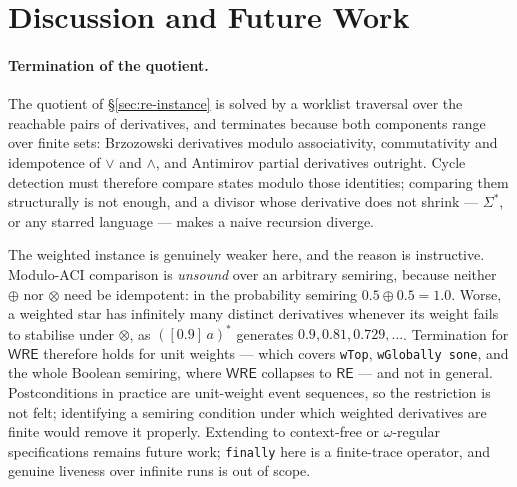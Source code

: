 \documentclass[acmsmall,screen]{acmart}
\newcommand{\RE}{\mathsf{RE}}
\newcommand{\WRE}{\mathsf{WRE}}
\begin{document}
\section{Discussion and Future Work}
\label{sec:discussion}

\paragraph{Termination of the quotient.}
The quotient of \S\ref{sec:re-instance} is solved by a worklist traversal
over the reachable pairs of derivatives, and terminates because both
components range over finite sets: Brzozowski derivatives modulo
associativity, commutativity and idempotence of $\vee$ and $\wedge$, and
Antimirov partial derivatives outright.
Cycle detection must therefore compare states modulo those identities;
comparing them structurally is not enough, and a divisor whose derivative
does not shrink --- $\Sigma^*$, or any starred language --- makes a naive
recursion diverge.

The weighted instance is genuinely weaker here, and the reason is
instructive.
Modulo-ACI comparison is \emph{unsound} over an arbitrary semiring, because
neither $\oplus$ nor $\otimes$ need be idempotent: in the probability
semiring $0.5 \oplus 0.5 = 1.0$.
Worse, a weighted star has infinitely many distinct derivatives whenever its
weight fails to stabilise under $\otimes$, as $([0.9]\,a)^*$ generates
$0.9, 0.81, 0.729, \dots$.
Termination for $\WRE$ therefore holds for unit weights --- which covers
\lstinline{wTop}, \lstinline{wGlobally sone}, and the whole Boolean
semiring, where $\WRE$ collapses to $\RE$ --- and not in general.
Postconditions in practice are unit-weight event sequences, so the
restriction is not felt; identifying a semiring condition under which
weighted derivatives are finite would remove it properly.
Extending to context-free or $\omega$-regular specifications remains future
work; \lstinline{finally} here is a finite-trace operator, and genuine
liveness over infinite runs is out of scope.
\end{document}
